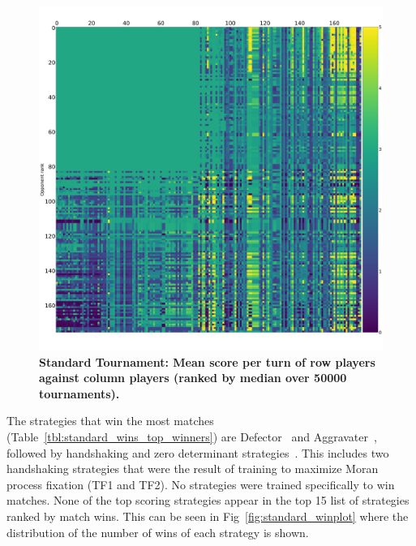 \documentclass[10pt,letterpaper]{article}
\begin{document}
\begin{figure}[!hbtp]
    \centering
    \includegraphics[width=\textwidth]{standard_scores_heatmap.pdf}
    \caption{\bf Standard Tournament: Mean score per turn of row players against
    column players (ranked by median over 50000 tournaments).}
    \label{fig:standard_heatmap}
\end{figure}

The strategies that win the most matches
(Table~\ref{tbl:standard_wins_top_winners}) are Defector~\cite{Axelrod1984} and Aggravater~\cite{axelrodproject}, followed
by handshaking and zero determinant strategies~\cite{Press2012}.
This includes two handshaking
strategies that were the result of training to maximize Moran process fixation
(TF1 and TF2). No strategies were trained specifically to win matches. None of
the top scoring strategies appear in the top 15 list of strategies ranked by
match wins. This can be seen in Fig~\ref{fig:standard_winplot} where the
distribution of the number of wins of each strategy is shown.
\end{document}
